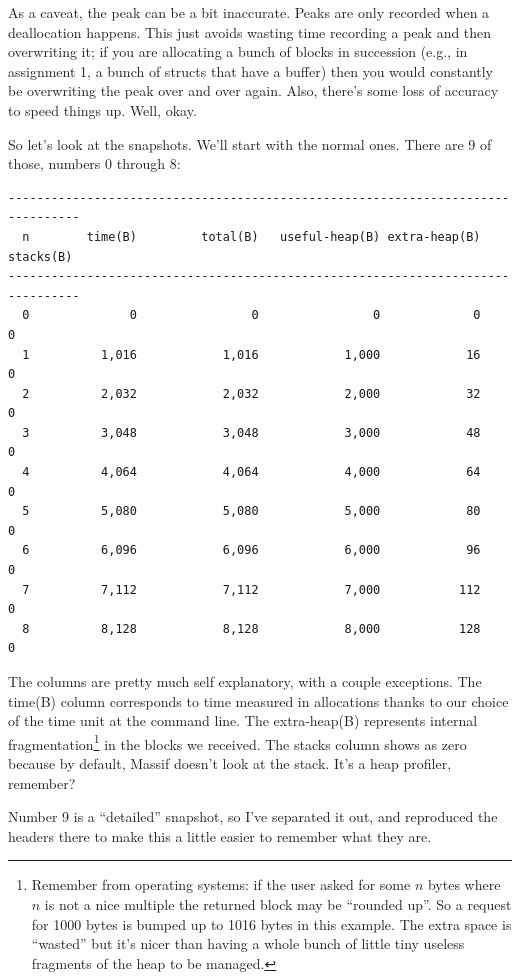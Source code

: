 \documentclass[a4paper]{report}
\begin{document}
As a caveat, the peak can be a bit inaccurate. Peaks are only recorded when a deallocation happens. This just avoids wasting time recording a peak and then overwriting it; if you are allocating a bunch of blocks in succession (e.g., in assignment 1, a bunch of structs that have a buffer) then you would constantly be overwriting the peak over and over again. Also, there's some loss of accuracy to speed things up. Well, okay.

So let's look at the snapshots. We'll start with the normal ones. There are 9 of those, numbers 0 through 8:

{\scriptsize
\begin{verbatim}
--------------------------------------------------------------------------------
  n        time(B)         total(B)   useful-heap(B) extra-heap(B)    stacks(B)
--------------------------------------------------------------------------------
  0              0                0                0             0            0
  1          1,016            1,016            1,000            16            0
  2          2,032            2,032            2,000            32            0
  3          3,048            3,048            3,000            48            0
  4          4,064            4,064            4,000            64            0
  5          5,080            5,080            5,000            80            0
  6          6,096            6,096            6,000            96            0
  7          7,112            7,112            7,000           112            0
  8          8,128            8,128            8,000           128            0
\end{verbatim}
}

The columns are pretty much self explanatory, with a couple exceptions. The time(B) column corresponds to time measured in allocations thanks to our choice of the time unit at the command line. The extra-heap(B) represents internal fragmentation\footnote{Remember from operating systems: if the user asked for some $n$ bytes where $n$ is not a nice multiple the returned block may be ``rounded up''. So a request for 1000 bytes is bumped up to 1016 bytes in this example. The extra space is ``wasted'' but it's nicer than having a whole bunch of little tiny useless fragments of the heap to be managed.} in the blocks we received. The stacks column shows as zero because by default, Massif doesn't look at the stack. It's a heap profiler, remember?

Number 9 is a ``detailed'' snapshot, so I've separated it out, and reproduced the headers there to make this a little easier to remember what they are.
\end{document}

